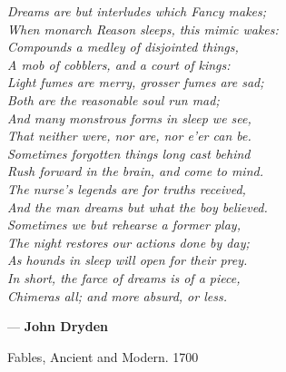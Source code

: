 
\newlength\longest
\null\vfill

\begin{large}
\settowidth{}

\begin{center}
\parbox{\longest}{
\begin{flushleft}
    {\book\fontsize{75}{0}\selectfont
    \color{ctcolorgraylight}
    \textit{\grqq}}
    {\itshape%
    Dreams are but interludes which Fancy makes;\\
    When monarch Reason sleeps, this mimic wakes:\\
    Compounds a medley of disjointed things,\\
    A mob of cobblers, and a court of kings:\\
    Light fumes are merry, grosser fumes are sad;\\
    Both are the reasonable soul run mad;\\
    And many monstrous forms in sleep we see,\\
    That neither were, nor are, nor e'er can be.\\
    Sometimes forgotten things long cast behind\\
    Rush forward in the brain, and come to mind.\\
    The nurse's legends are for truths received,\\
    And the man dreams but what the boy believed.\\
    Sometimes we but rehearse a former play,\\
    The night restores our actions done by day;\\
    As hounds in sleep will open for their prey.\\
    In short, the farce of dreams is of a piece,\\
    Chimeras all; and more absurd, or less. \\}
\end{flushleft}
\begin{flushright}
    {\book\fontsize{75}{0}\selectfont
    \color{ctcolorgraylight}
    \textit{\glqq}}
    \par\vspace*{.75cm}
    --- \textbf{John Dryden}\par
    Fables, Ancient and Modern. 1700
\end{flushright}
}
\end{center}
\end{large}
\vfill\vfill
\cleardoublepage
